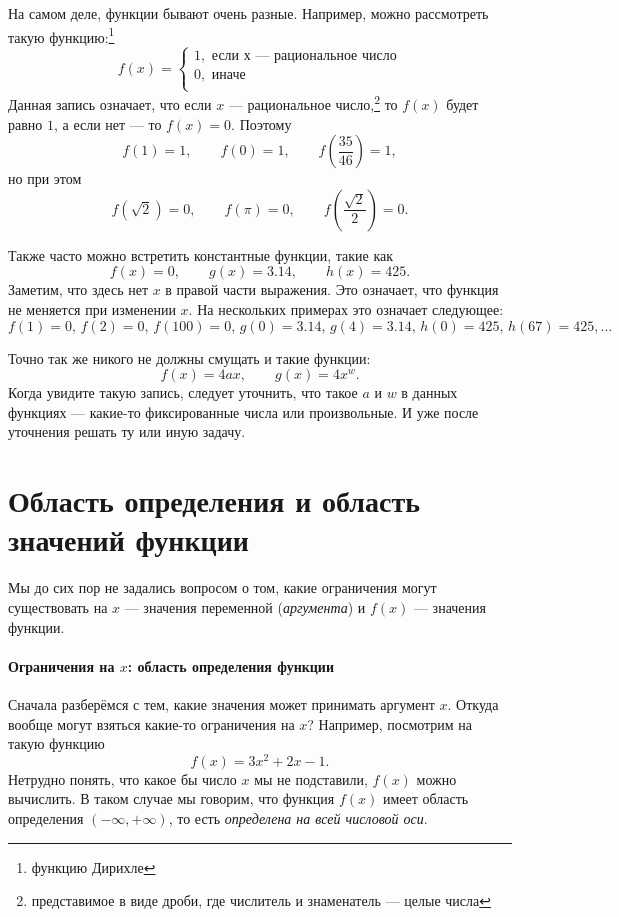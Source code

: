 \documentclass[11pt,fleqn]{book} %
\begin{document}
\begin{remark}
На самом деле, функции бывают очень разные. Например, можно рассмотреть такую функцию:\footnote{функцию Дирихле}
$$
f(x) = \begin{cases}
1, \text{ если х --- рациональное число} \\
0, \text{ иначе} \\
\end{cases}
$$
Данная запись означает, что если $x$ --- рациональное число,\footnote{представимое в виде дроби, где числитель и знаменатель --- целые числа} то $f(x)$ будет равно $1$, а если нет --- то $f(x) = 0$. Поэтому $$f(1) = 1, \qquad f(0) = 1, \qquad f\left(\frac{35}{46}\right) = 1,$$
но при этом
$$f(\sqrt{2}) = 0, \qquad f(\pi) = 0, \qquad f\left(\frac{\sqrt{2}}{2}\right) = 0.$$

Также часто можно встретить константные функции, такие как $$f(x) = 0, \qquad g(x)=3.14,\qquad h(x) = 425.$$ Заметим, что здесь нет $x$ в правой части выражения. Это означает, что функция не меняется при изменении $x$. На нескольких примерах это означает следующее: $$f(1) = 0,\, f(2) = 0,\, f(100) = 0,\, g(0) = 3.14,\,g(4) = 3.14,\, h(0) = 425,\, h(67) = 425, \ldots$$

Точно так же никого не должны смущать и такие функции: $$f(x) = 4ax,\qquad g(x) = 4x^w.$$ Когда увидите такую запись, следует уточнить, что такое $a$ и $w$ в данных функциях --- какие-то фиксированные числа или произвольные. И уже после уточнения решать ту или иную задачу.

\end{remark}

\section{Область определения и область значений функции}

Мы до сих пор не задались вопросом о том, какие ограничения могут существовать на $x$ --- значения переменной (\textit{аргумента}) и $f(x)$ --- значения функции.

\paragraph{Ограничения на $x$: область определения функции}
Сначала разберёмся с тем, какие значения может принимать аргумент $x$. Откуда вообще могут взяться какие-то ограничения на $x$? Например, посмотрим на такую функцию $$f(x) = 3x^2 + 2x - 1.$$ Нетрудно понять, что какое бы число $x$ мы не подставили, $f(x)$ можно вычислить. В таком случае мы говорим, что функция $f(x)$ имеет область определения $(-\infty, +\infty)$, то есть \textit{определена на всей числовой оси}. 
\end{document}
